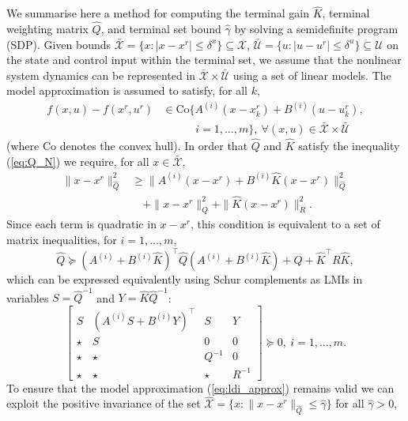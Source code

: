 \documentclass[a4paper, 10 pt, conference]{IEEEconf}
\def\U{\mathcal{U}}
\def\X{\mathcal{X}}
\def\Co{\mathrm{Co}}
\begin{document}
\appendix
We summarise here a method for computing the terminal gain $\hat{K}$, terminal weighting matrix $\hat{Q}$, and terminal set bound $\hat{\gamma}$ by solving a semidefinite program (SDP).
%
Given bounds $\bar{\X}=\{x : \lvert x - x^r \rvert \leq \delta^x\}\subseteq\X$, $\bar{\U} = \{u: \lvert u - u^r \rvert \leq \delta^u\}\subseteq\U$ on the state and control input within the terminal set, we assume that the nonlinear system dynamics 
can be represented in $\bar{\X}\times\bar{\U}$
using a set of linear models.
The model approximation is assumed to satisfy, for all $k$,
\begin{equation}\label{eq:ldi_approx}
\begin{aligned}
f(x,u) - f(x^r, u^r) &\in \Co\{ A^{(i)} (x-x^r_k) + B^{(i)} (u - u^r_k), 
\\
&\qquad \quad i = 1,\ldots,m\} , \ \forall (x,u) \in \bar{\X}\times \bar{\U}
\end{aligned}
\end{equation}
(where $\Co$ denotes the convex hull). 
In order that $\hat{Q}$ and $\hat{K}$ satisfy the inequality (\ref{eq:Q_N}) we require, for all $ x\in \bar{\X}$,
\begin{align*}
\|x - x^r \|^2_{\hat{Q}} &\geq \bigl\|A^{(i)} (x-x^r) + B^{(i)} \hat{K} (x -x^r) \bigr\|^2_{\hat{Q}}  
\\
&\quad + \|x-x^r\|^2_Q + \|\hat{K} (x-x^r) \|^2_R .
\end{align*}
Since each term is quadratic in $x-x^r$, this condition is equivalent to a set of matrix inequalities, for $i = 1,\ldots,m$,
\[%
\hat{Q} \succeq (A^{(i)}+B^{(i)}\hat{K})^\top \hat{Q} (A^{(i)}+B^{(i)}\hat{K}) + Q + \hat{K}^\top R \hat{K} ,
\]%
which can be expressed equivalently using Schur complements as LMIs in variables $S = \hat{Q}^{-1}$ and $Y = \hat{K}\hat{Q}^{-1}$:
\begin{equation}\label{eq:term_weight_lmi}
\begin{bmatrix}
S & (A^{(i)}S + B^{(i)}Y)^\top & S & Y \\
\star & S & 0 & 0 \\
\star & \star & Q^{-1} & 0 \\
\star & \star & \star &  R^{-1} 
\end{bmatrix} \succeq 0, \ i = 1,\ldots,m.
\end{equation}
To ensure that the model approximation (\ref{eq:ldi_approx}) remains valid we can exploit the positive invariance of the set $\hat{\X}=\{x : \|x - x^r\|_{\hat{Q}} \leq \hat{\gamma}\}$ for all $\hat{\gamma} > 0$, 
\end{document}
